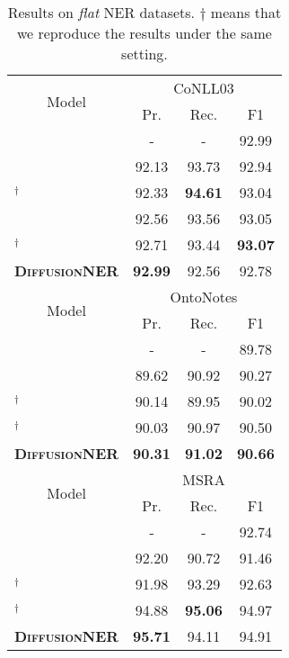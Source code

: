 \documentclass[11pt]{article}
\begin{document}
\begin{table}[]
\centering
\small
\begin{tabular}{lccc}
\toprule
\multicolumn{1}{c}{\multirow{2}{*}{Model}}   & \multicolumn{3}{c}{CoNLL03}  \\

 \cmidrule(lr){2-4} 
&  Pr.  & Rec. & F1 \\
\midrule
\citet{lu-etal-2022-unified} & - & -  & 92.99  \\
\citet{shen-etal-2021-locate} & 92.13 & {93.73} & 92.94  \\
\citet{li-etal-2020-unified}$^\dagger$ & 92.33 & \textbf{94.61} & 93.04 \\
\citet{yan-etal-2021-unified-generative} & 92.56 & 93.56 & 93.05  \\
\citet{li2022unified}$^\dagger$ & 92.71 & 93.44 & \textbf{93.07}  \\
\midrule
\textbf{\textsc{DiffusionNER}} & \textbf{92.99} & 92.56 & 92.78  \\
\toprule
\multicolumn{1}{c}{\multirow{2}{*}{Model}}    & \multicolumn{3}{c}{OntoNotes}    \\

 \cmidrule(lr){2-4}  
&  Pr.  & Rec. & F1   \\
\midrule
\citet{https://doi.org/10.48550/arxiv.1911.04474} & -  & -  & 89.78\\
\citet{yan-etal-2021-unified-generative}  & 89.62 & 90.92 & 90.27 \\
\citet{li-etal-2020-unified}$^\dagger$ & {90.14} & 89.95 & {90.02}  \\
\citet{li2022unified}$^\dagger$ &{90.03} & 90.97 & {90.50}  \\
\midrule
\textbf{\textsc{DiffusionNER}} & \textbf{90.31} & \textbf{91.02} & \textbf{90.66}  \\

\toprule
\multicolumn{1}{c}{\multirow{2}{*}{Model}}    & \multicolumn{3}{c}{MSRA}    \\

 \cmidrule(lr){2-4}  
&  Pr.  & Rec. & F1   \\
\midrule
\citet{https://doi.org/10.48550/arxiv.1911.04474} & -  & -  & 92.74  \\
\citet{shen-etal-2021-locate} &  92.20 & 90.72 & 91.46  \\
\citet{li-etal-2020-unified}$^\dagger$ & 91.98 & 93.29 & 92.63 \\

\citet{li2022unified}$^\dagger$ & {94.88} & \textbf{95.06} & {94.97} \\
\midrule
\textbf{\textsc{DiffusionNER}} & \textbf{95.71} & 94.11 & 94.91 \\
\bottomrule
\end{tabular}
\caption{Results on \textit{flat} NER datasets. $\dagger$ means that we reproduce the results under the same setting.}
\label{tab:flat}
\end{table}
\end{document}
